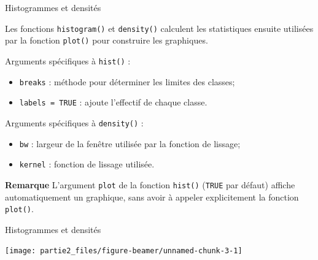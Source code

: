 \documentclass[12pt,ignorenonframetext,]{beamer}
\newenvironment{Shaded}{}{}
\newcommand{\DataTypeTok}[1]{#1}
\newcommand{\DecValTok}[1]{#1}
\newcommand{\KeywordTok}[1]{\textcolor[rgb]{0.00,0.00,1.00}{#1}}
\newcommand{\NormalTok}[1]{#1}
\newcommand{\OperatorTok}[1]{#1}
\newcommand{\OtherTok}[1]{\textcolor[rgb]{1.00,0.25,0.00}{#1}}
\newcommand{\StringTok}[1]{\textcolor[rgb]{0.00,0.50,0.50}{#1}}
\providecommand{\tightlist}{%
  \setlength{\itemsep}{0pt}\setlength{\parskip}{0pt}}
\renewenvironment{Shaded}{\begin{snugshade}}{\end{snugshade}}
\newcommand{\intertitre}[1]{\textcolor{redInsee}{\textbf{#1}}}
\begin{document}
\begin{frame}[fragile]{Histogrammes et densités}
\protect\hypertarget{histogrammes-et-densites}{}

Les fonctions \texttt{histogram()} et \texttt{density()} calculent les
statistiques ensuite utilisées par la fonction \texttt{plot()} pour
construire les graphiques.

\pause Arguments spécifiques à \texttt{hist()} : \vspace{-0.3cm}

\begin{itemize}
\tightlist
\item
  \texttt{breaks} : méthode pour déterminer les limites des classes;
\item
  \texttt{labels\ =\ TRUE} : ajoute l’effectif de chaque classe.
\end{itemize}

\pause Arguments spécifiques à \texttt{density()} : \vspace{-0.3cm}

\begin{itemize}
\tightlist
\item
  \texttt{bw} : largeur de la fenêtre utilisée par la fonction de
  lissage;
\item
  \texttt{kernel} : fonction de lissage utilisée.
\end{itemize}

\pause

\intertitre{Remarque} L’argument \texttt{plot} de la fonction
\texttt{hist()} (\texttt{TRUE} par défaut) affiche automatiquement un
graphique, sans avoir à appeler explicitement la fonction
\texttt{plot()}.

\end{frame}

\begin{frame}[fragile]{Histogrammes et densités}
\protect\hypertarget{histogrammes-et-densites-1}{}

\centering \footnotesize

\begin{Shaded}
\end{Shaded}

\texttt{[image: partie2\_files/figure-beamer/unnamed-chunk-3-1]}

\end{frame}
\end{document}
